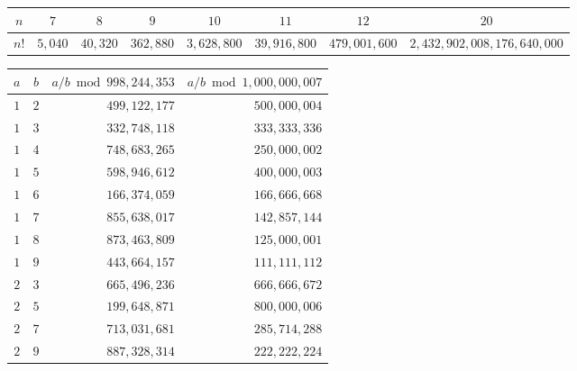 \vspace{1em}

\begin{center}
    \begin{tabular}{|c|c|c|c|c|c|c|c|}
        \hline
        $n$ & $7$ & $8$ & $9$ & $10$ & $11$ & $12$ & $20$ \\
        \hline
        $n!$ & $5,040$ & $40,320$ & $362,880$ & $3,628,800$ & $39,916,800$ & $479,001,600$ & $2,432,902,008,176,640,000$ \\
        \hline
    \end{tabular}
\end{center}

\vspace{1em}

\begin{center}
    \begin{minipage}[t]{.6\linewidth}
        \vspace{0pt}
        \centering
        \begin{tabular}{|c|c|r|r|}
            \hline
            $a$ & $b$ & $a/b \bmod 998,244,353$ & $a/b \bmod 1,000,000,007$ \\
            \hline
            $1$ & $2$ & $499,122,177$ & $500,000,004$ \\
            \hline
            $1$ & $3$ & $332,748,118$ & $333,333,336$ \\
            \hline
            $1$ & $4$ & $748,683,265$ & $250,000,002$ \\
            \hline
            $1$ & $5$ & $598,946,612$ & $400,000,003$ \\
            \hline
            $1$ & $6$ & $166,374,059$ & $166,666,668$ \\
            \hline
            $1$ & $7$ & $855,638,017$ & $142,857,144$ \\
            \hline
            $1$ & $8$ & $873,463,809$ & $125,000,001$ \\
            \hline
            $1$ & $9$ & $443,664,157$ & $111,111,112$ \\
            \hline
            $2$ & $3$ & $665,496,236$ & $666,666,672$ \\
            \hline
            $2$ & $5$ & $199,648,871$ & $800,000,006$ \\
            \hline
            $2$ & $7$ & $713,031,681$ & $285,714,288$ \\
            \hline
            $2$ & $9$ & $887,328,314$ & $222,222,224$ \\

\end{tabular}
\end{minipage}
\end{center}
